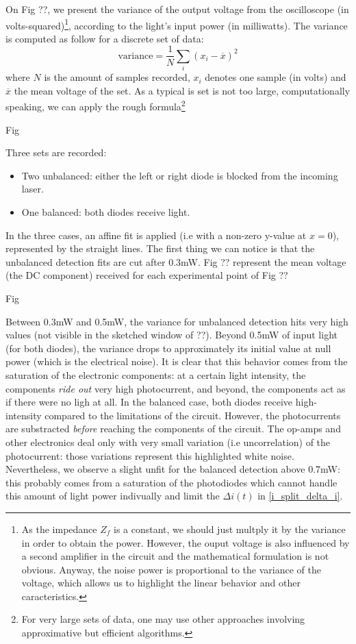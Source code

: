 \documentclass[12pt]{report}
\begin{document}
On Fig ??, we present the variance of the output voltage from the oscilloscope (in volts-squared)\footnote{As the impedance $Z_f$ is a constant, we should just multply it by the variance in order to obtain the power. However, the ouput voltage is also influenced by a second amplifier in the circuit and the mathematical formulation is not obvious. Anyway, the noise power is proportional to the variance of the voltage, which allows us to highlight the linear behavior and other caracteristics.}, according to the light's input power (in milliwatts). The variance is computed as follow for a discrete set of data:
\begin{equation}
\textrm{variance} = \frac{1}{N}\sum_{i} (x_i - \overline{x})^2
\end{equation}
where $N$ is the amount of samples recorded, $x_i$ denotes one sample (in volts) and $\overline{x}$ the mean voltage of the set. As a typical is set is not too large, computationally speaking, we can apply the rough formula\footnote{For very large sets of data, one may use other approaches involving approximative but efficient algorithms.}

Fig

Three sets are recorded:
\begin{itemize}
	\item Two unbalanced: either the left or right diode is blocked from the incoming laser.
	\item One balanced: both diodes receive light.
\end{itemize}
In the three cases, an affine fit is applied (i.e with a non-zero y-value at $x=0$), represented by the straight lines. The first thing we can notice is that the unbalanced detection fits are cut after 0.3mW. Fig ?? represent the mean voltage (the DC component) received for each experimental point of Fig ??

Fig

Between 0.3mW and 0.5mW, the variance for unbalanced detection hits very high values (not visible in the sketched window of ??). Beyond 0.5mW of input light (for both diodes), the variance drops to approximately its initial value at null power (which is the electrical noise). It is clear that this behavior comes from the saturation of the electronic components: at a certain light intensity, the components \textit{ride out} very high photocurrent, and beyond, the components act as if there were no ligh at all. In the balanced case, both diodes receive high-intensity compared to the limitations of the circuit. However, the photocurrents are substracted \textit{before} reaching the components of the circuit. The op-amps and other electronics deal only with very small variation (i.e uncorrelation) of the photocurrent: those variations represent this highlighted white noise. Nevertheless, we observe a slight unfit for the balanced detection above 0.7mW: this probably comes from a saturation of the photodiodes which cannot handle this amount of light power indivually and limit the $\Delta i(t)$ in \eqref{i_split_delta_i}.
\end{document}
